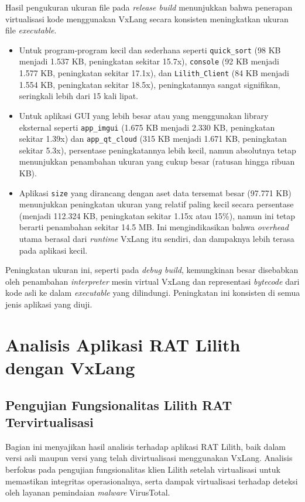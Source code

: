 Hasil pengukuran ukuran file pada \textit{release build} menunjukkan bahwa penerapan virtualisasi kode menggunakan VxLang secara konsisten meningkatkan ukuran file \textit{executable}.
\begin{itemize}
    \item Untuk program-program kecil dan sederhana seperti \texttt{quick\_sort} (98 KB menjadi 1.537 KB, peningkatan sekitar 15.7x), \texttt{console} (92 KB menjadi 1.577 KB, peningkatan sekitar 17.1x), dan \texttt{Lilith\_Client} (84 KB menjadi 1.554 KB, peningkatan sekitar 18.5x), peningkatannya sangat signifikan, seringkali lebih dari 15 kali lipat.
    \item Untuk aplikasi GUI yang lebih besar atau yang menggunakan library eksternal seperti \texttt{app\_imgui} (1.675 KB menjadi 2.330 KB, peningkatan sekitar 1.39x) dan \texttt{app\_qt\_cloud} (315 KB menjadi 1.671 KB, peningkatan sekitar 5.3x), persentase peningkatannya lebih kecil, namun absolutnya tetap menunjukkan penambahan ukuran yang cukup besar (ratusan hingga ribuan KB).
    \item Aplikasi \texttt{size} yang dirancang dengan aset data tersemat besar (97.771 KB) menunjukkan peningkatan ukuran yang relatif paling kecil secara persentase (menjadi 112.324 KB, peningkatan sekitar 1.15x atau 15\%), namun ini tetap berarti penambahan sekitar 14.5 MB. Ini mengindikasikan bahwa \textit{overhead} utama berasal dari \textit{runtime} VxLang itu sendiri, dan dampaknya lebih terasa pada aplikasi kecil.
\end{itemize}
Peningkatan ukuran ini, seperti pada \textit{debug build}, kemungkinan besar disebabkan oleh penambahan \textit{interpreter} mesin virtual VxLang dan representasi \textit{bytecode} dari kode asli ke dalam \textit{executable} yang dilindungi. Peningkatan ini konsisten di semua jenis aplikasi yang diuji.

\section{Analisis Aplikasi RAT Lilith dengan VxLang}
\label{bab:hasil_penelitian_lilith} 

\subsection{Pengujian Fungsionalitas Lilith RAT Tervirtualisasi}
\label{subsec:fungsionalitas_lilith_virtualized}
Bagian ini menyajikan hasil analisis terhadap aplikasi RAT Lilith, baik dalam versi asli maupun versi yang telah divirtualisasi menggunakan VxLang. Analisis berfokus pada pengujian fungsionalitas klien Lilith setelah virtualisasi untuk memastikan integritas operasionalnya, serta dampak virtualisasi terhadap deteksi oleh layanan pemindaian \textit{malware} VirusTotal.


